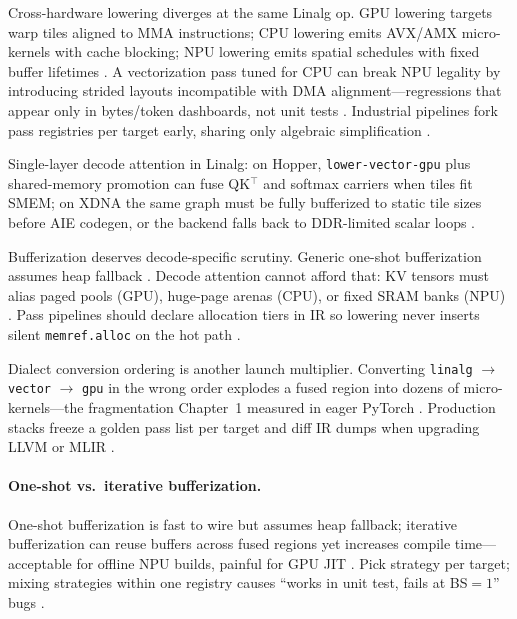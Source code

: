 Cross-hardware lowering diverges at the same Linalg op. GPU lowering targets warp tiles aligned to MMA instructions; CPU lowering emits AVX/AMX micro-kernels with cache blocking; NPU lowering emits spatial schedules with fixed buffer lifetimes \citep{amd2024xdna,nvidia2022hopper}. A vectorization pass tuned for CPU can break NPU legality by introducing strided layouts incompatible with DMA alignment---regressions that appear only in bytes/token dashboards, not unit tests \citep{memoryfloor2026}. Industrial pipelines fork pass registries per target early, sharing only algebraic simplification \citep{liu2024deepseekv3}.

\begin{example}
Single-layer decode attention in Linalg: on Hopper, \texttt{lower-vector-gpu} plus shared-memory promotion can fuse QK$^\top$ and softmax carriers when tiles fit SMEM; on XDNA the same graph must be fully bufferized to static tile sizes before AIE codegen, or the backend falls back to DDR-limited scalar loops \citep{amd2024aie,yirage2026,semianalysis2024tma}.
\end{example}

Bufferization deserves decode-specific scrutiny. Generic one-shot bufferization assumes heap fallback \citep{chen2020compilerbasedhardw}. Decode attention cannot afford that: KV tensors must alias paged pools (GPU), huge-page arenas (CPU), or fixed SRAM banks (NPU) \citep{kwon2023vllm,amd2024aie}. Pass pipelines should declare allocation tiers in IR so lowering never inserts silent \texttt{memref.alloc} on the hot path \citep{yirage2026,memoryfloor2026}.

Dialect conversion ordering is another launch multiplier. Converting \texttt{linalg} $\rightarrow$ \texttt{vector} $\rightarrow$ \texttt{gpu} in the wrong order explodes a fused region into dozens of micro-kernels---the fragmentation Chapter~1 measured in eager PyTorch \citep{taxbreak2026}. Production stacks freeze a golden pass list per target and diff IR dumps when upgrading LLVM or MLIR \citep{liu2024deepseekv3,chen2020compilerbasedhardw}.

\paragraph{One-shot vs.\ iterative bufferization.} One-shot bufferization is fast to wire but assumes heap fallback; iterative bufferization can reuse buffers across fused regions yet increases compile time---acceptable for offline NPU builds, painful for GPU JIT \citep{amd2024aie,yirage2026}. Pick strategy per target; mixing strategies within one registry causes ``works in unit test, fails at BS${=}1$'' bugs \citep{memoryfloor2026,kwon2023vllm}.


